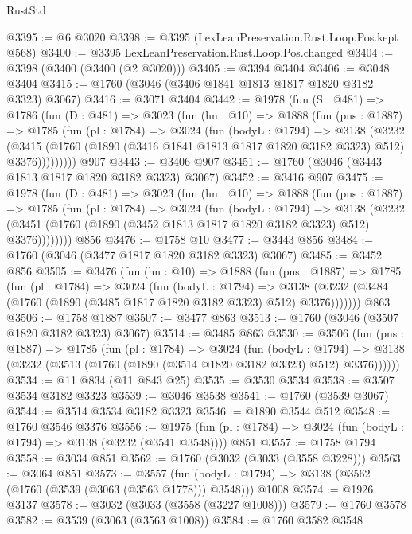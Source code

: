 \begin{lexlean}{RustStd}
\begin{coremodule}
@3395 := @6 @3020
@3398 := @3395 (LexLeanPreservation.Rust.Loop.Pos.kept @568)
@3400 := @3395 LexLeanPreservation.Rust.Loop.Pos.changed
@3404 := @3398 (@3400 (@3400 (@2 @3020)))
@3405 := @3394 @3404
@3406 := @3048 @3404
@3415 := @1760 (@3046 (@3406 @1841 @1813 @1817 @1820 @3182 @3323) @3067)
@3416 := @3071 @3404
@3442 := @1978
    (fun (S : @481) =>
    @1786
      (fun (D : @481) =>
      @3023
        (fun (hn : @10) =>
        @1888
          (fun (pns : @1887) =>
          @1785
            (fun (pl : @1784) =>
            @3024
              (fun (bodyL : @1794) =>
              @3138
                (@3232
                  (@3415
                    (@1760 (@1890 (@3416 @1841 @1813 @1817 @1820 @3182 @3323) @512) @3376)))))))))
    @907
@3443 := @3406 @907
@3451 := @1760 (@3046 (@3443 @1813 @1817 @1820 @3182 @3323) @3067)
@3452 := @3416 @907
@3475 := @1978
    (fun (D : @481) =>
    @3023
      (fun (hn : @10) =>
      @1888
        (fun (pns : @1887) =>
        @1785
          (fun (pl : @1784) =>
          @3024
            (fun (bodyL : @1794) =>
            @3138
              (@3232 (@3451 (@1760 (@1890 (@3452 @1813 @1817 @1820 @3182 @3323) @512) @3376))))))))
    @856
@3476 := @1758 @10
@3477 := @3443 @856
@3484 := @1760 (@3046 (@3477 @1817 @1820 @3182 @3323) @3067)
@3485 := @3452 @856
@3505 := @3476
    (fun (hn : @10) =>
    @1888
      (fun (pns : @1887) =>
      @1785
        (fun (pl : @1784) =>
        @3024
          (fun (bodyL : @1794) =>
          @3138 (@3232 (@3484 (@1760 (@1890 (@3485 @1817 @1820 @3182 @3323) @512) @3376)))))))
    @863
@3506 := @1758 @1887
@3507 := @3477 @863
@3513 := @1760 (@3046 (@3507 @1820 @3182 @3323) @3067)
@3514 := @3485 @863
@3530 := @3506
    (fun (pns : @1887) =>
    @1785
      (fun (pl : @1784) =>
      @3024
        (fun (bodyL : @1794) =>
        @3138 (@3232 (@3513 (@1760 (@1890 (@3514 @1820 @3182 @3323) @512) @3376))))))
@3534 := @11 @834 (@11 @843 @25)
@3535 := @3530 @3534
@3538 := @3507 @3534 @3182 @3323
@3539 := @3046 @3538
@3541 := @1760 (@3539 @3067)
@3544 := @3514 @3534 @3182 @3323
@3546 := @1890 @3544 @512
@3548 := @1760 @3546 @3376
@3556 := @1975 (fun (pl : @1784) => @3024 (fun (bodyL : @1794) => @3138 (@3232 (@3541 @3548)))) @851
@3557 := @1758 @1794
@3558 := @3034 @851
@3562 := @1760 (@3032 (@3033 (@3558 @3228)))
@3563 := @3064 @851
@3573 := @3557
    (fun (bodyL : @1794) => @3138 (@3562 (@1760 (@3539 (@3063 (@3563 @1778))) @3548)))
    @1008
@3574 := @1926 @3137
@3578 := @3032 (@3033 (@3558 (@3227 @1008)))
@3579 := @1760 @3578
@3582 := @3539 (@3063 (@3563 @1008))
@3584 := @1760 @3582 @3548

\end{coremodule}
\end{lexlean}
